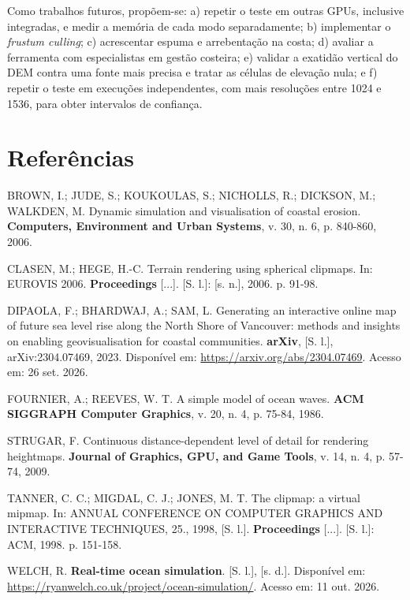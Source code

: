 \documentclass[conference]{IEEEtran}
\begin{document}
Como trabalhos futuros, propõem-se: a) repetir o teste em outras GPUs, inclusive integradas, e medir a memória de cada modo separadamente; b) implementar o
\emph{frustum culling}; c) acrescentar espuma e arrebentação na costa;
d) avaliar a ferramenta com especialistas em gestão costeira; e) validar a
exatidão vertical do DEM contra uma fonte mais precisa e tratar as células de
elevação nula; e f) repetir o teste em execuções independentes, com mais
resoluções entre 1024 e 1536, para obter intervalos de confiança.

\section*{Referências}
\begingroup
\footnotesize
\raggedright
\setlength{\parindent}{0pt}
\setlength{\parskip}{4pt}

BROWN, I.; JUDE, S.; KOUKOULAS, S.; NICHOLLS, R.; DICKSON, M.; WALKDEN,
M. Dynamic simulation and visualisation of coastal erosion. \textbf{Computers,
Environment and Urban Systems}, v. 30, n. 6, p. 840-860, 2006.

CLASEN, M.; HEGE, H.-C. Terrain rendering using spherical clipmaps. In:
EUROVIS 2006. \textbf{Proceedings} [...]. [S. l.]: [s. n.], 2006. p. 91-98.

DIPAOLA, F.; BHARDWAJ, A.; SAM, L. Generating an interactive online map of
future sea level rise along the North Shore of Vancouver: methods and
insights on enabling geovisualisation for coastal communities. \textbf{arXiv},
[S. l.], arXiv:2304.07469, 2023. Disponível em:
\url{https://arxiv.org/abs/2304.07469}. Acesso em: 26 set. 2026.

FOURNIER, A.; REEVES, W. T. A simple model of ocean waves. \textbf{ACM
SIGGRAPH Computer Graphics}, v. 20, n. 4, p. 75-84, 1986.

STRUGAR, F. Continuous distance-dependent level of detail for rendering
heightmaps. \textbf{Journal of Graphics, GPU, and Game Tools}, v. 14, n. 4,
p. 57-74, 2009.

TANNER, C. C.; MIGDAL, C. J.; JONES, M. T. The clipmap: a virtual mipmap.
In: ANNUAL CONFERENCE ON COMPUTER GRAPHICS AND INTERACTIVE TECHNIQUES, 25.,
1998, [S. l.]. \textbf{Proceedings} [...]. [S. l.]: ACM, 1998. p. 151-158.

WELCH, R. \textbf{Real-time ocean simulation}. [S. l.], [s. d.].
Disponível em: \url{https://ryanwelch.co.uk/project/ocean-simulation/}.
Acesso em: 11 out. 2026.
\endgroup
\end{document}

